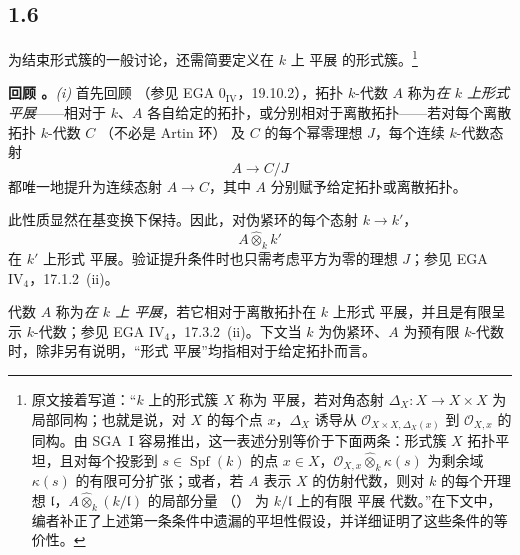 \subsection*{1.6} \label{sga3:VIIB:1.6}

为结束形式簇的一般讨论，还需简要定义在 \(k\) 上 平展 的形式簇。\footnote{\label{sga3:VIIB:nde:70}原文接着写道：“\(k\) 上的形式簇 \(X\) 称为 平展，若对角态射 \(\Delta_X:X\to X\times X\) 为局部同构；也就是说，对 \(X\) 的每个点 \(x\)，\(\Delta_X\) 诱导从 \(\mathcal O_{X\times X,\Delta_X(x)}\) 到 \(\mathcal O_{X,x}\) 的同构。由 SGA~I 容易推出，这一表述分别等价于下面两条：形式簇 \(X\) 拓扑平坦，且对每个投影到 \(s\in\operatorname{Spf}(k)\) 的点 \(x\in X\)，\(\mathcal O_{X,x}\widehat\otimes_k\kappa(s)\) 为剩余域 \(\kappa(s)\) 的有限可分扩张；或者，若 \(A\) 表示 \(X\) 的仿射代数，则对 \(k\) 的每个开理想 \(\mathfrak l\)，\(A\widehat\otimes_k(k/\mathfrak l)\) 的局部分量 \textup{（）} 为 \(k/\mathfrak l\) 上的有限 平展 代数。”在下文中，编者补正了上述第一条条件中遗漏的平坦性假设，并详细证明了这些条件的等价性。}

\medskip\noindent\textbf{回顾 。} \label{sga3:VIIB:1.6.A}\textit{(i)} 首先回顾 \textup{（参见 EGA \(0_{\mathrm{IV}}\)，19.10.2）}，拓扑 \(k\)-代数 \(A\) 称为\emph{在 \(k\) 上形式 平展}——相对于 \(k\)、\(A\) 各自给定的拓扑，或分别相对于离散拓扑——若对每个离散拓扑 \(k\)-代数 \(C\) \textup{（不必是 Artin 环）} 及 \(C\) 的每个幂零理想 \(J\)，每个连续 \(k\)-代数态射 \[
  A\longrightarrow C/J
\] 都唯一地提升为连续态射 \(A\to C\)，其中 \(A\) 分别赋予给定拓扑或离散拓扑。

此性质显然在基变换下保持。因此，对伪紧环的每个态射 \(k\to k'\)，\[
  A\widehat\otimes_k k'
\] 在 \(k'\) 上形式 平展。验证提升条件时也只需考虑平方为零的理想 \(J\)；参见 EGA \(\mathrm{IV}_4\)，17.1.2~(ii)。

代数 \(A\) 称为\emph{在 \(k\) 上 平展}，若它相对于离散拓扑在 \(k\) 上形式 平展，并且是有限呈示 \(k\)-代数；参见 EGA \(\mathrm{IV}_4\)，17.3.2~(ii)。下文当 \(k\) 为伪紧环、\(A\) 为预有限 \(k\)-代数时，除非另有说明，“形式 平展”均指相对于给定拓扑而言。

